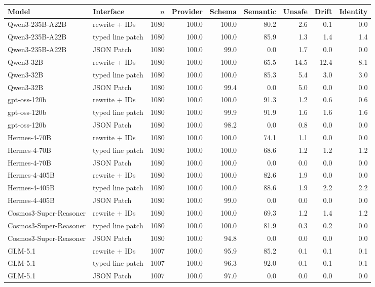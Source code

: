\begin{tabular}{llrrrrrrr}
\toprule
Model & Interface & $n$ & Provider & Schema & Semantic & Unsafe & Drift & Identity \\
\midrule
Qwen3-235B-A22B & rewrite + IDs & 1080 & 100.0 & 100.0 & 80.2 & 2.6 & 0.1 & 0.0 \\
Qwen3-235B-A22B & typed line patch & 1080 & 100.0 & 100.0 & 85.9 & 1.3 & 1.4 & 1.4 \\
Qwen3-235B-A22B & JSON Patch & 1080 & 100.0 & 99.0 & 0.0 & 1.7 & 0.0 & 0.0 \\
Qwen3-32B & rewrite + IDs & 1080 & 100.0 & 100.0 & 65.5 & 14.5 & 12.4 & 8.1 \\
Qwen3-32B & typed line patch & 1080 & 100.0 & 100.0 & 85.3 & 5.4 & 3.0 & 3.0 \\
Qwen3-32B & JSON Patch & 1080 & 100.0 & 99.4 & 0.0 & 5.0 & 0.0 & 0.0 \\
gpt-oss-120b & rewrite + IDs & 1080 & 100.0 & 100.0 & 91.3 & 1.2 & 0.6 & 0.6 \\
gpt-oss-120b & typed line patch & 1080 & 100.0 & 99.9 & 91.9 & 1.6 & 1.6 & 1.6 \\
gpt-oss-120b & JSON Patch & 1080 & 100.0 & 98.2 & 0.0 & 0.8 & 0.0 & 0.0 \\
Hermes-4-70B & rewrite + IDs & 1080 & 100.0 & 100.0 & 74.1 & 1.1 & 0.0 & 0.0 \\
Hermes-4-70B & typed line patch & 1080 & 100.0 & 100.0 & 68.6 & 1.2 & 1.2 & 1.2 \\
Hermes-4-70B & JSON Patch & 1080 & 100.0 & 100.0 & 0.0 & 0.0 & 0.0 & 0.0 \\
Hermes-4-405B & rewrite + IDs & 1080 & 100.0 & 100.0 & 82.6 & 1.9 & 0.0 & 0.0 \\
Hermes-4-405B & typed line patch & 1080 & 100.0 & 100.0 & 88.6 & 1.9 & 2.2 & 2.2 \\
Hermes-4-405B & JSON Patch & 1080 & 100.0 & 99.0 & 0.0 & 0.0 & 0.0 & 0.0 \\
Cosmos3-Super-Reasoner & rewrite + IDs & 1080 & 100.0 & 100.0 & 69.3 & 1.2 & 1.4 & 1.2 \\
Cosmos3-Super-Reasoner & typed line patch & 1080 & 100.0 & 100.0 & 81.9 & 0.3 & 0.2 & 0.0 \\
Cosmos3-Super-Reasoner & JSON Patch & 1080 & 100.0 & 94.8 & 0.0 & 0.0 & 0.0 & 0.0 \\
GLM-5.1 & rewrite + IDs & 1007 & 100.0 & 95.9 & 85.2 & 0.1 & 0.1 & 0.1 \\
GLM-5.1 & typed line patch & 1007 & 100.0 & 96.3 & 92.0 & 0.1 & 0.1 & 0.1 \\
GLM-5.1 & JSON Patch & 1007 & 100.0 & 97.0 & 0.0 & 0.0 & 0.0 & 0.0 \\
\bottomrule
\end{tabular}
